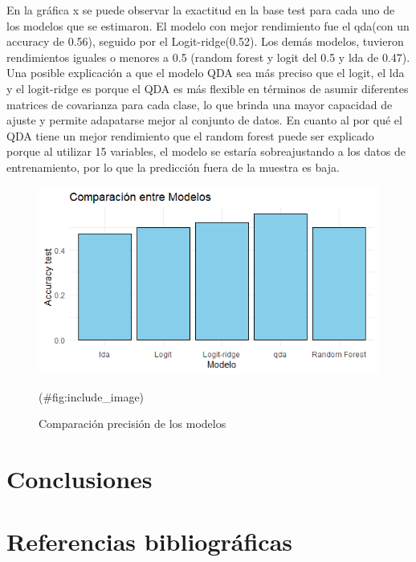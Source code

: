 \documentclass[
  11pt,
  letterpaper,
]{article}
\newlength{\cslhangindent}
\newlength{\cslentryspacingunit} %
\newenvironment{CSLReferences}[2] %
 {%
  \setlength{\parindent}{0pt}
  \ifodd #1
  \let\oldpar\par
  \def\par{\hangindent=\cslhangindent\oldpar}
  \fi
  \setlength{\parskip}{#2\cslentryspacingunit}
 }%
 {}
\begin{document}
En la gráfica x se puede observar la exactitud en la base test para cada uno de los modelos que se estimaron. El modelo con mejor rendimiento fue el qda(con un accuracy de 0.56), seguido por el Logit-ridge(0.52). Los demás modelos, tuvieron rendimientos iguales o menores a 0.5 (random forest y logit del 0.5 y lda de 0.47). Una posible explicación a que el modelo QDA sea más preciso que el logit, el lda y el logit-ridge es porque el QDA es más flexible en términos de asumir diferentes matrices de covarianza para cada clase, lo que brinda una mayor capacidad de ajuste y permite adapatarse mejor al conjunto de datos. En cuanto al por qué el QDA tiene un mejor rendimiento que el random forest puede ser explicado porque al utilizar 15 variables, el modelo se estaría sobreajustando a los datos de entrenamiento, por lo que la predicción fuera de la muestra es baja.

\begin{figure}[H]

{\centering \includegraphics[width=7.51in]{../views/comparacion_modelos} 

}

\caption{Comparación precisión de los modelos}(\#fig:include_image)
\end{figure}

\hypertarget{conclusiones}{%
\section{Conclusiones}\label{conclusiones}}

\hypertarget{referencias-bibliogruxe1ficas}{%
\section{Referencias bibliográficas}\label{referencias-bibliogruxe1ficas}}

\hypertarget{refs}{}
\begin{CSLReferences}{0}{0}
\end{CSLReferences}
\end{document}
